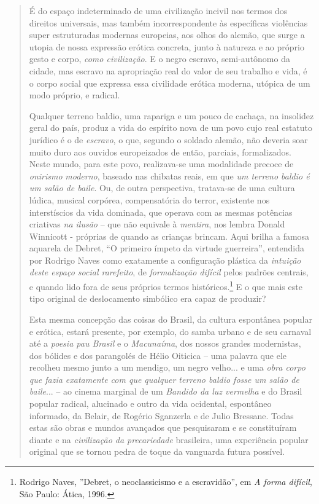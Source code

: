 \begin{quote}
É do espaço indeterminado de uma civilização incivil nos termos dos
direitos universais, mas também incorrespondente às específicas
violências super estruturadas modernas europeias, aos olhos do alemão,
que surge a utopia de nossa expressão erótica concreta, junto à natureza
e ao próprio gesto e corpo, \emph{como civilização}. E o negro escravo,
semi-autônomo da cidade, mas escravo na apropriação real do valor de seu
trabalho e vida, é o corpo social que expressa essa civilidade erótica
moderna, utópica de um modo próprio, e radical.

Qualquer terreno baldio, uma rapariga e um pouco de cachaça, na
insolidez geral do país, produz a vida do espírito nova de um povo cujo
real estatuto jurídico é o de \emph{escravo}, o que, segundo o soldado
alemão, não deveria soar muito duro aos ouvidos europeizados de então,
parciais, formalizados. Neste mundo, para este povo, realizava-se uma
modalidade precoce de \emph{onirismo} \emph{moderno}, baseado nas
chibatas reais, em que \emph{um terreno baldio é um salão de baile}. Ou,
de outra perspectiva, tratava-se de uma cultura lúdica, musical
corpórea, compensatória do terror, existente nos interstíscios da vida
dominada, que operava com as mesmas potências criativas \emph{na ilusão}
-- que não equivale à \emph{mentira}, nos lembra Donald Winnicott -
próprias de quando as crianças brincam. Aqui brilha a famosa aquarela de
Debret, ``O primeiro ímpeto da virtude guerreira'', entendida por
Rodrigo Naves como exatamente a configuração plástica da \emph{intuição
deste espaço social rarefeito}, de \emph{formalização difícil} pelos
padrões centrais, e quando lido fora de seus próprios termos
históricos.\footnote{Rodrigo Naves, ''Debret, o neoclassicismo e a
  escravidão'', em \emph{A forma difícil}, São Paulo: Ática, 1996.} E o
que mais este tipo original de deslocamento simbólico era capaz de
produzir?

Esta mesma concepção das coisas do Brasil, da cultura espontânea popular
e erótica, estará presente, por exemplo, do samba urbano e de seu
carnaval até a \emph{poesia pau Brasil} e o \emph{Macunaíma}, dos nossos
grandes modernistas, dos bólides e dos parangolés de Hélio Oiticica --
uma palavra que ele recolheu mesmo junto a um mendigo, um negro velho...
e uma \emph{obra corpo} \emph{que fazia exatamente com que qualquer
terreno baldio fosse um salão de baile}... -- ao cinema marginal de um
\emph{Bandido da luz vermelha} e do Brasil popular radical, alucinado e
outro da vida ocidental, espontâneo informado, da Belair, de Rogério
Sganzerla e de Julio Bressane. Todas estas são obras e mundos avançados
que pesquisaram e se constituíram diante e na \emph{civilização da
precariedade} brasileira, uma experiência popular original que se tornou
pedra de toque da vanguarda futura possível.


\end{quote}
